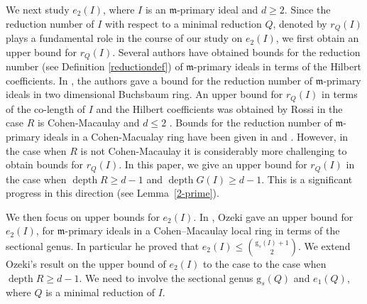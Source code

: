 \documentclass[reqno,a4paper,dvipsnames]{amsart}
\newcommand{\m}{\mathfrak{m} }
\newcommand{\depth}{\operatorname{depth}}
\theoremstyle{definition}
\begin{document}
We next study $e_2(I)$, where $I$ is an $\m$-primary ideal and $d \geq 2$. Since the reduction number of $I$ 
with respect to a minimal reduction $Q$, denoted by $r_Q(I)$  plays a fundamental role in the course of our 
study on $e_2(I)$, we first obtain an upper bound for $r_Q(I)$. Several authors have obtained bounds for the 
reduction number (see Definition \ref{reductiondef}) of $\m$-primary ideals    in terms of the Hilbert 
coefficients.  In \cite{gghv}, the authors gave  a bound  for the reduction number of $\m$-primary ideals  
in two dimensional Buchsbaum ring. An upper bound for $r_Q(I)$  in terms of the co-length of $I$ and the Hilbert coefficients was obtained by Rossi in the case $R$ is Cohen-Macaulay and $d\le 2$ \cite[Corollary 1.5]{rossi1}.  Bounds for  the reduction number of  $\m$-primary ideals in a Cohen-Macualay ring have been given in   \cite{rv} and   \cite{mandal-saloni}. 
However, in the case when $R$ is not Cohen-Macaulay it is considerably  more challenging to obtain bounds for $r_Q(I)$. In this paper,   we  give an upper bound for $r_Q(I)$ in the case when $\depth R \ge d-1$ and $\depth G(I) \geq d-1$. This is a significant progress in this direction (see Lemma~\ref{2-prime}).

We then focus on upper bounds for $e_{2}(I).$ In \cite[Proposition 3.2]{ozeki}, Ozeki gave an upper bound 
for $e_2(I)$, for $\m$-primary ideals in a  Cohen–Macaulay  local ring in terms of the sectional genus.  In particular he proved that $e_{2}(I) \leq \binom{\mathrm{g}_{s}(I)+1}{2}.$  
We extend Ozeki's result on the upper bound of $e_2(I)$ to the case to the case when $\depth R \geq d-1$. We need to involve the sectional genus  $\mathrm{g}_s(Q)$ and $e_1(Q)$, where $Q$ is a minimal reduction of $I$. 
\end{document}
